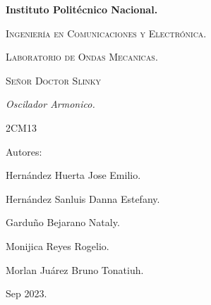 \documentclass[10pt]{article}
\begin{document}
\pagestyle{fancy}
\cfoot{}


\lhead{}

\begin{titlepage}

	\begin{figure}[t]
		\hspace{0.6\textwidth}
	\end{figure}

	\centering
	{\bfseries\Huge Instituto Politécnico Nacional. \par}
	\vspace{1cm}
	{\scshape\Large Ingeniería en Comunicaciones y Electrónica. \par}
	\vspace{0.3cm}
	{\scshape\Large Laboratorio de Ondas Mecanicas.  \par}
	\vspace{1cm}
	{\scshape\Huge Señor Doctor Slinky \par}
	\vspace{1cm}
	{\itshape\Large Oscilador Armonico. \par}
	{\Large 2CM13\par}
	\vfill
	{\Large Autores: \par}
	{\Large Hernández Huerta Jose Emilio. \par}
	{\Large Hernández Sanluis Danna Estefany.  \par}
	{\Large Garduño Bejarano Nataly. \par}
	{\Large Monijica Reyes Rogelio.\par}
	{\Large Morlan Juárez Bruno Tonatiuh.  \par}
	\vfill
	{\Large Sep 2023. \par}

\end{titlepage}
\end{document}
